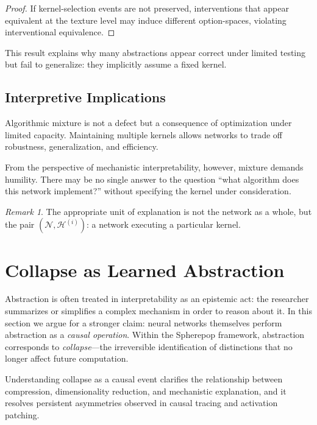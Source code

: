 \documentclass[11pt]{article}
\theoremstyle{remark}
\newtheorem{remark}{Remark}
\newcommand{\Hist}{\mathcal{H}}
\newcommand{\NN}{\mathcal{N}}
\begin{document}
\begin{proof}
If kernel-selection events are not preserved, interventions that appear
equivalent at the texture level may induce different option-spaces,
violating interventional equivalence.
\end{proof}

This result explains why many abstractions appear correct under limited
testing but fail to generalize: they implicitly assume a fixed kernel.

\subsection{Interpretive Implications}

Algorithmic mixture is not a defect but a consequence of optimization
under limited capacity. Maintaining multiple kernels allows networks to
trade off robustness, generalization, and efficiency.

From the perspective of mechanistic interpretability, however, mixture
demands humility. There may be no single answer to the question
``what algorithm does this network implement?'' without specifying the
kernel under consideration.

\begin{remark}
The appropriate unit of explanation is not the network as a whole, but
the pair $(\NN, \Hist^{(i)})$: a network executing a particular kernel.
\end{remark}

\section{Collapse as Learned Abstraction}

Abstraction is often treated in interpretability as an epistemic act:
the researcher summarizes or simplifies a complex mechanism in order
to reason about it. In this section we argue for a stronger claim:
neural networks themselves perform abstraction as a \emph{causal
operation}. Within the Spherepop framework, abstraction corresponds to
\emph{collapse}—the irreversible identification of distinctions that no
longer affect future computation.

Understanding collapse as a causal event clarifies the relationship
between compression, dimensionality reduction, and mechanistic
explanation, and it resolves persistent asymmetries observed in causal
tracing and activation patching.
\end{document}
